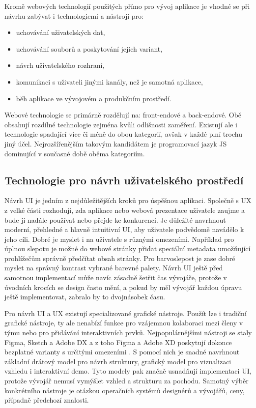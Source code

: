 Kromě webových technologií použitých přímo pro vývoj aplikace je vhodné se při návrhu zabývat i technologiemi a nástroji
pro:
\begin{itemize}
	\item uchovávání uživatelských dat,
	\item uchovávání souborů a poskytování jejich variant,
	\item návrh uživatelského rozhraní,
	\item komunikaci s uživateli jinými kanály, než je samotná aplikace,
	\item běh aplikace ve vývojovém a produkčním prostředí.
\end{itemize}

Webové technologie se primárně rozdělují na: front-endové a back-endové.
Obě obsahují rozdílné technologie zejména kvůli odlišnosti zaměření.
Existují ale i technologie spadající více či méně do obou kategorií, avšak v každé plní trochu jiný účel.
Nejrozšířenějším takovým kandidátem je programovací jazyk \ac{JS} dominující v současné době oběma kategoriím.

	\subsection{Technologie pro návrh uživatelského prostředí}

	Návrh \ac{UI} je jedním z nejdůležitějších kroků pro úspěšnou aplikaci.
	Společně s \ac{UX} z velké části rozhodují, zda aplikace nebo webová prezentace
	uživatele zaujme a bude jí nadále používat nebo přejde ke konkurenci.
	Je důležité navrhnout moderní, přehledné a hlavně intuitivní \ac{UI}, aby uživatele podvědomě navádělo k jeho cíli.
	Dobré je myslet i na uživatele s různými omezeními.
	Například pro úplnou slepotu je možné do webové stránky přidat speciální metadata umožňující prohlížečům správně
	předčítat obsah stránky.
	Pro barvoslepost je zase dobré myslet na správný kontrast vybrané barevné palety.
	Návrh \ac{UI} ještě před samotnou implementací může navíc zásadně šetřit čas vývojáře, protože v úvodních krocích
	se design často mění, a pokud by měl vývojář každou úpravu ještě implementovat, zabralo by to dvojnásobek času.

	Pro návrh \ac{UI} a \ac{UX} existují specializované grafické nástroje.
	Použít lze i tradiční grafické nástroje, ty ale nenabízí funkce pro vzájemnou kolaboraci mezi
	členy v týmu nebo pro přidávání interaktivních prvků.
	Nejpopulárnějšími nástroji se staly Figma, Sketch a Adobe DX a z toho Figma a Adobe XD poskytují dokonce bezplatné
	varianty s určitými omezeními \cite{design_tools_database}.
	S pomocí nich je snadné navrhnout základní drátový model pro návrh struktury, grafický model pro vizualizaci
	vzhledu i interaktivní demo.
	Tyto modely pak značně usnadňují implementaci \ac{UI}, protože vývojář nemusí vymýšlet
	vzhled a strukturu za pochodu.
	Samotný výběr konkrétního nástroje je otázkou operačních systémů designérů a vývojářů, ceny, případně
	předchozí znalosti.

